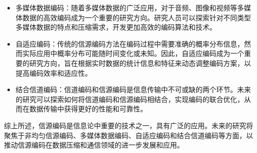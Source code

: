 \begin{multicols}{2}
\begin{itemize}
	\item 多媒体数据编码：随着多媒体数据的广泛应用，对于音频、图像和视频等多媒体数据的高效编码成为一个重要的研究方向。研究人员可以探索针对不同类型多媒体数据的特点和压缩需求，开发更加高效的编码算法和技术。
	
	\item 自适应编码：传统的信源编码方法在编码过程中需要准确的概率分布信息，然而实际应用中概率分布可能随时间变化或未知。因此，自适应编码成为一个重要的研究方向，旨在根据实时数据的统计信息和特征来动态调整编码方案，以提高编码效率和适应性。
	
	\item 结合信道编码：信道编码和信源编码是信息传输中不可或缺的两个环节。未来的研究可以探索如何将信道编码和信源编码相结合，实现编码的联合优化，从而在数据传输中获得更好的性能和可靠性。
\end{itemize}

综上所述，信源编码是信息论中重要的技术之一，具有广泛的应用。未来的研究将聚焦于非均匀信源编码、多媒体数据编码、自适应编码和结合信道编码等方面，以推动信源编码在数据压缩和通信领域的进一步发展和应用。
\end{multicols}




















